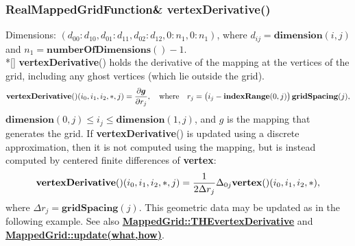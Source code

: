 \documentclass{article}
\begin{document}
  \subsubsection{RealMappedGridFunction\& vertexDerivative()}
  \label{MappedGrid::vertexDerivative()}
    Dimensions: $(d_{00}\colon d_{10},d_{01}\colon d_{11},d_{02}\colon d_{12},0\colon n_1,0\colon n_1)$,
    where $d_{ij} = \textbf{dimension}(i,j)$ and $n_1 = \textbf{numberOfDimensions}() - 1$. \\*[\parskip]
    \textbf{vertexDerivative}() holds the derivative of the mapping at the vertices of the grid,
    including any ghost vertices (which lie outside the grid).
    \[
      \textbf{vertexDerivative}()(i_0,i_1,i_2,\ast,j) = {\partial \mbox{\boldmath $g$} \over \partial r_j},
      \quad\mbox{where}\quad
      r_j = \big(i_j - \textbf{indexRange}(0,j)\big)\,\textbf{gridSpacing}(j),
    \]
    $\textbf{dimension}(0,j) \le i_j \le \textbf{dimension}(1,j)$, and {\boldmath $g$} is the mapping that generates the grid.
    If \textbf{vertexDerivative}() is updated using a discrete approximation, then it is not computed using the mapping, but is instead
    computed by centered finite differences of \textbf{vertex}:
    \[
      \textbf{vertexDerivative}()(i_0,i_1,i_2,\ast,j) = {1 \over 2\Delta r_j} \Delta_{0j} \textbf{vertex}()(i_0,i_1,i_2,\ast),
    \]
    where $\Delta r_j = \textbf{gridSpacing}(j)$.
    This geometric data may be updated as in the following example.
    See also {\bf{}\hyperref{THEvertexDerivative}{THEvertexDerivative \rm(\S}{)}{MappedGrid::THEvertexDerivative}} and
    {\bf{}\hyperref{update(what,how)}{update(what,how) \rm(\S}{)}{MappedGrid::update(what,how)}}.
\end{document}
